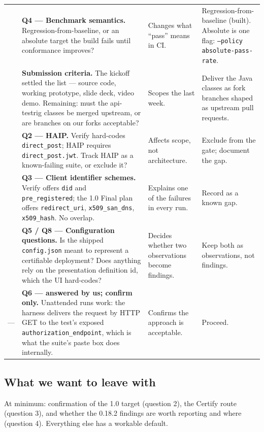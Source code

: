 \documentclass[10pt,a4paper]{article}
\newcommand{\us}{\_}
\begin{document}
\begin{longtable}{@{}p{0.5cm}p{5.0cm}p{5.0cm}p{5.0cm}@{}}
\addlinespace
5 & \textbf{Q4 --- Benchmark semantics.} Regression-from-baseline, or an absolute target the
build fails until conformance improves?
& Changes what ``pass'' means in CI.
& Regression-from-baseline (built). Absolute is one flag: \texttt{--policy
absolute-pass-rate}.\\
\addlinespace
6 & \textbf{Submission criteria.} The kickoff settled the list --- source code, working
prototype, slide deck, video demo. Remaining: must the api-testrig classes be merged upstream,
or are branches on our forks acceptable?
& Scopes the last week.
& Deliver the Java classes as fork branches shaped as upstream pull requests.\\
\addlinespace
7 & \textbf{Q2 --- HAIP.} Verify hard-codes \texttt{direct\us{}post}; HAIP requires
\texttt{direct\us{}post.jwt}. Track HAIP as a known-failing suite, or exclude it?
& Affects scope, not architecture.
& Exclude from the gate; document the gap.\\
\addlinespace
8 & \textbf{Q3 --- Client identifier schemes.} Verify offers \texttt{did} and
\texttt{pre\us{}registered}; the 1.0 Final plan offers \texttt{redirect\us{}uri},
\texttt{x509\us{}san\us{}dns}, \texttt{x509\us{}hash}. No overlap.
& Explains one of the failures in every run.
& Record as a known gap.\\
\addlinespace
9 & \textbf{Q5 / Q8 --- Configuration questions.} Is the shipped \texttt{config.json}
meant to represent a certifiable deployment? Does anything rely on the presentation definition id,
which the UI hard-codes?
& Decides whether two observations become findings.
& Keep both as observations, not findings.\\
\addlinespace
--- & \textbf{Q6 --- answered by us; confirm only.} Unattended runs work: the harness
delivers the request by HTTP GET to the test's exposed \texttt{authorization\us{}endpoint},
which is what the suite's paste box does internally.
& Confirms the approach is acceptable.
& Proceed.\\
\bottomrule
\end{longtable}

\subsection{What we want to leave with}

At minimum: confirmation of the 1.0 target (question 2), the Certify route (question 3),
and whether the 0.18.2 findings are worth reporting and where (question 4). Everything else
has a workable default.
\end{document}
